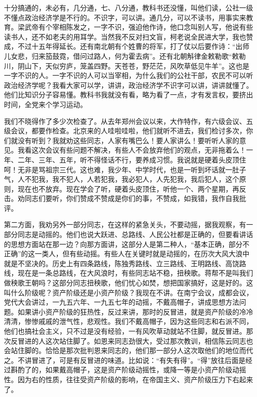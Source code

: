 十分搞通的，未必有，几分通，七、八分通，教科书还没懂，叫他们读，公社一级不懂点政治经济学是不行的。不识字，可以讲。通几分，可以不读书，用事实来教育。梁武帝有个宰相陈发之，一字不识，强迫他作诗，他口念叫别人写，他说有些读书人，还不如老夫的用耳学。当然我不反对扫文盲，柯老说全民进大学，我也赞成，不过十五年得延长。还有南北朝有个姓曹的将军，打了仗以后要作诗：“出师儿女悲，归来笳鼓霓，借问过路人，何为霍去病”。还有北朝斛律金敕勒歌“敕勒川，阴山下，天似穷庐，笼盖四野。天苍苍，野茫茫，风吹草低见牛羊”。这也是一字不识的人。一字不识的人可以当宰相，为什么我们的公社干部，农民不可以听政治经济学呢？我看大家可以学，讲讲，政治经济学不识字可以讲，讲讲就懂了。他们比知识分子容易懂。教科书我就没有看，略为看了一点，才有发言权，要挤出时间，全党来个学习运动。

我们不晓得作了多少次检查了。从去年郑州会议以来，大作特作，有六级会议、五级会议，都要作检查。北京来的人哇啦哇啦，他们就听不进去，我们检讨多次，你们就没有听到？我就劝这些同志，人家有嘴巴么！要人家讲么！要听听人家的意见。我看这次会议有些问题不解决，有些人不会放弃他们的观点，无非拖着么！一年、二年、三年、五年，听不得怪话不行，要养成习惯。我说就是硬着头皮顶住呵！无非是骂祖宗三代。这也难，我少年、中学时代，也是一听到坏话就一肚子气，人不犯我，我不犯人，人若犯我，我必犯人，人先犯我，我后犯人，这个原则，现在也不放弃。现在学会了听，硬着头皮顶住，听他一个、两个星期，再反击。劝同志们要听，你们赞成不赞成是你们的事，不赞成，如我错，我作自我批评。

第二方面，我劝另外一部分同志，在这样的紧急关头，不要动摇，据我观察，有一部分同志是动摇的。他们也说大跃进、总路线、人民公社都是正确的，但要看讲话的思想方面站在那一边？向那方面讲，这部分人是第二种人，“基本正确，部分不正确”的这一类人，但有些动摇。有些人在关键时就是动摇的，在历次大风大浪中就是不坚决的。历史上有四条路线，陈独秀路线、立三路线、王明路线、高饶路线，现在是一条总路线，在大风浪时，有些同志站不稳，扭秧歌。蒋帮不是叫我们做秧歌王朝吗？这部分同志扭秧歌，他们忧心如焚，想把国家搞好，这是好的。这叫什么阶级呢？资产阶级还是小资产阶级？我现在不讲。在南宁会议，成都会议，党代大会讲过，一九五六年、一九五七年的动摇，不戴高帽子，讲成思想方法问题。如果讲小资产阶级的狂热性，反过来讲，那时的反冒进，就是资产阶级的冷冷清清，惨惨戚戚的泄气性，悲观性。我们不戴高帽子，因为这些同志和右派不同，他们也搞社会主义，只不过是没有经验，一有风吹草动就站不住脚，就反冒进。那次反冒进的人这次站住脚了。如恩来同志劲很大，受过那次教训，相信陈云同志也会站住脚的。恰恰是那次批判恩来同志的，他们那一部分人这次取他们的地位而代之。不讲冒进了，可是有反冒进的味道。比如说：“有失有得”。“得”放往后面是经过斟酌了的，如果戴高帽子，这是资产阶级动摇性，或降一等是小资产阶级动摇性。因为右的性质，往往受资产阶级的影响，在帝国主义、资产阶级压力下右起来了。

